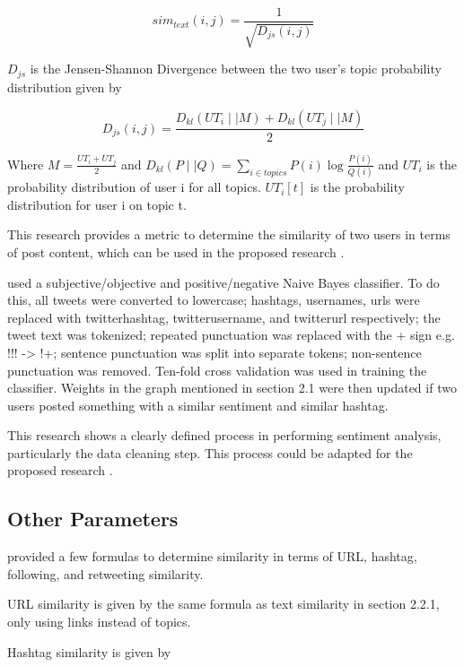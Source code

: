 \begin{equation}
sim_{text}(i,j) = \frac{1}{\sqrt{D_{js}(i,j)}}
\end{equation}

$D_{js}$ is the Jensen-Shannon Divergence between the two user’s topic probability distribution given by

\begin{equation}
D_{js}(i,j) = \frac{D_{kl}(UT_i \mid\mid M) + D_{kl}(UT_j \mid\mid M)}{2}
\end{equation}

Where $M = \frac{UT_i + UT_j}{2}$ and $D_{kl}(P \mid\mid Q) = \sum_{i \in topics} P(i) \log{\frac{P(i)}{Q(i)}}$ and $UT_i$ is the probability distribution of user i for all topics. $UT_i[t]$ is the probability distribution for user i on topic t.

This research provides a metric to determine the similarity of two users in terms of post content, which can be used in the proposed research \cite{Zhang:2012}.

 used a subjective/objective and positive/negative Naive Bayes classifier. To do this, all tweets were converted to lowercase; hashtags, usernames, urls were replaced with twitterhashtag, twitterusername, and twitterurl respectively; the tweet text was tokenized; repeated punctuation was replaced with the + sign e.g. !!! -> !+; sentence punctuation was split into separate tokens; non-sentence punctuation was removed. Ten-fold cross validation was used in training the classifier. Weights in the graph mentioned in section 2.1 were then updated if two users posted something with a similar sentiment and similar hashtag. 

This research shows a clearly defined process in performing sentiment analysis, particularly the data cleaning step. This process could be adapted for the proposed research \cite{Deitrick:2013}.

\subsection{Other Parameters}

 provided a few formulas to determine similarity in terms of URL, hashtag, following, and retweeting similarity.

URL similarity is given by the same formula as text similarity in section 2.2.1, only using links instead of topics.

Hashtag similarity is given by 

